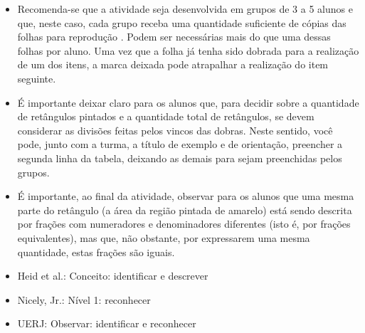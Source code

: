 \begin{multicols}{2}
\begin{itemize} %
    \item       Recomenda-se que a atividade seja desenvolvida em grupos de 3 a 
5 alunos e que, neste caso, cada grupo receba uma quantidade suficiente de 
cópias das             folhas para reprodução      . Podem ser necessárias mais 
do que uma dessas folhas por aluno. Uma vez que a folha já tenha sido dobrada 
para a realização de um dos itens, a marca deixada pode atrapalhar a realização 
do item seguinte. 
    \item       É importante deixar claro para os alunos que, para decidir sobre 
a quantidade de retângulos pintados e a quantidade total de retângulos, se devem 
considerar as divisões feitas pelos vincos das dobras. Neste sentido, você pode, 
junto com a turma, a título de exemplo e de orientação, preencher a segunda 
linha da tabela, deixando as demais para sejam preenchidas pelos grupos.
    \item       É importante, ao final da atividade, observar para os alunos que 
uma mesma parte do retângulo (a área da região pintada de amarelo) está sendo 
descrita por frações com numeradores e denominadores diferentes (isto é, por 
frações equivalentes), mas que, não obstante, por expressarem uma mesma 
quantidade, estas frações são iguais. 
\end{itemize} %
  
  
   \vspace{.1cm}
  
 \vspace{.1cm}
  
\begin{itemize} %
    \item       Heid et al.: Conceito: identificar e descrever
    \item       Nicely, Jr.: Nível 1: reconhecer
    \item       UERJ: Observar: identificar e reconhecer
\end{itemize} %
  
  \end{multicols}
  \pagebreak
  
